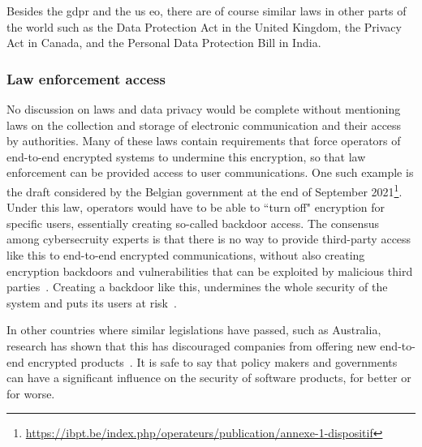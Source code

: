 Besides the \gls{gdpr} and the \gls{us} \gls{eo}, there are of course similar laws in other parts of the world such as the Data Protection Act in the United Kingdom, the Privacy Act in Canada, and the Personal Data Protection Bill in India.

\subsubsection{Law enforcement access}
No discussion on laws and data privacy would be complete without mentioning laws on the collection and storage of electronic communication and their access by authorities.
Many of these laws contain requirements that force operators of end-to-end encrypted systems to undermine this encryption, so that law enforcement can be provided access to user communications.
One such example is the draft considered by the Belgian government at the end of September 2021\footnote{\url{https://ibpt.be/index.php/operateurs/publication/annexe-1-dispositif}}.
Under this law, operators would have to be able to ``turn off" encryption for specific users, essentially creating so-called backdoor access.
The consensus among cybersecruity experts is that there is no way to provide third-party access like this to end-to-end encrypted communications, without also creating encryption backdoors and vulnerabilities that can be exploited by malicious third parties~\cite{bliss1996effective}.
Creating a backdoor like this, undermines the whole security of the system and puts its users at risk~\cite{encryptionmyths}.

In other countries where similar legislations have passed, such as Australia, research has shown that this has discouraged companies from offering new end-to-end encrypted products~\cite{barker2021economic}.
It is safe to say that policy makers and governments can have a significant influence on the security of software products, for better or for worse.